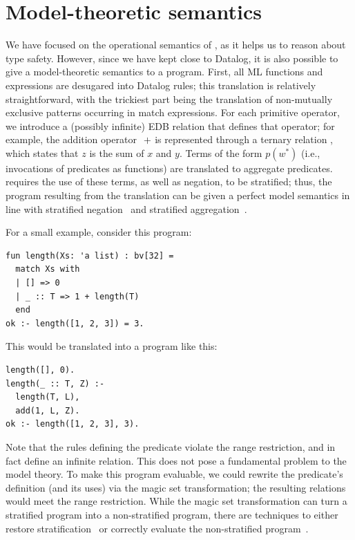 \documentclass[acmsmall,screen,nonacm]{acmart}
\theoremstyle{definition}
\begin{document}
\section{Model-theoretic semantics}\label{sec:modeltheory}

We have focused on the operational semantics of \Name, as it helps us to
reason about type safety.
However, since we have kept \Name close to Datalog, it is also possible to give
a model-theoretic semantics to a \Name program.
First, all ML functions and expressions are desugared into Datalog rules; this
translation is relatively straightforward, with the trickiest part being the
translation of non-mutually exclusive patterns occurring in match expressions.
For each primitive operator, we introduce a (possibly infinite) EDB relation
that defines that operator; for example, the addition operator $~\ic{+}$ is
represented through a ternary relation , which states
that $z$ is the sum of $x$ and $y$.
Terms of the form $p(w^*)$ (i.e., invocations of predicates as functions) are
translated to aggregate predicates.
\Name requires the use of these terms, as well as negation, to be stratified;
thus, the program resulting from the translation can be given a perfect model
semantics in line with stratified
negation~\citep{apt1988towards,przymusinski1988declarative,vangelder1989negation}
and stratified aggregation~\citep{mumick1990magic}.

For a small example, consider this \Name program:
\begin{lstlisting}
fun length(Xs: 'a list) : bv[32] =
  match Xs with
  | [] => 0
  | _ :: T => 1 + length(T)
  end
ok :- length([1, 2, 3]) = 3.
\end{lstlisting}
This would be translated into a program like this:
\begin{lstlisting}
length([], 0).
length(_ :: T, Z) :-
  length(T, L),
  add(1, L, Z).
ok :- length([1, 2, 3], 3).
\end{lstlisting}
Note that the rules defining the  predicate violate the range
restriction, and in fact define an infinite relation.
This does not pose a fundamental problem to the model theory.
To make this program evaluable, we could rewrite the  predicate's
definition (and its uses) via the magic set transformation; the resulting
relations would meet the range restriction.
While the magic set transformation can turn a stratified program into a
non-stratified program, there are techniques to either restore
stratification~\citep{meskes1993generalized} or correctly evaluate the
non-stratified program~\citep{mumick1990magic,balbin}.
\fi %
\end{document}
